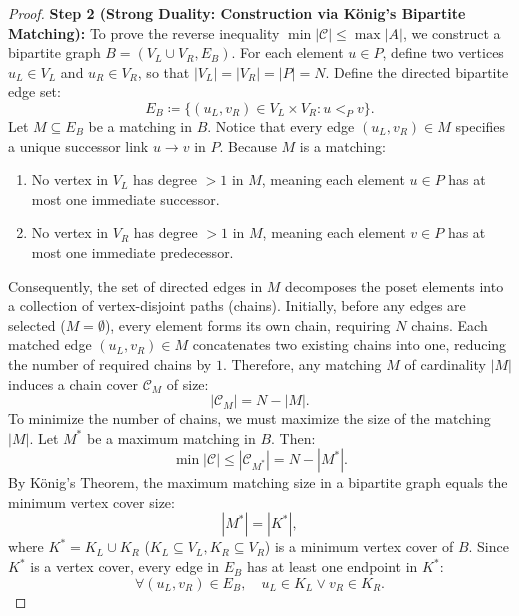 \documentclass[11pt, letterpaper]{article}
\begin{document}
\begin{proof}
\medskip\noindent\textbf{Step 2 (Strong Duality: Construction via K\"{o}nig's Bipartite Matching):}
To prove the reverse inequality $\min |\mathcal{C}| \le \max |A|$, we construct a bipartite graph $B = (V_L \cup V_R, E_B)$. 
For each element $u \in P$, define two vertices $u_L \in V_L$ and $u_R \in V_R$, so that $|V_L| = |V_R| = |P| = N$. 
Define the directed bipartite edge set:
\begin{equation}
    E_B \coloneqq \{(u_L, v_R) \in V_L \times V_R : u <_P v\}.
\end{equation}
Let $M \subseteq E_B$ be a matching in $B$. Notice that every edge $(u_L, v_R) \in M$ specifies a unique successor link $u \to v$ in $P$. Because $M$ is a matching:
\begin{enumerate}
    \item No vertex in $V_L$ has degree $> 1$ in $M$, meaning each element $u \in P$ has at most one immediate successor.
    \item No vertex in $V_R$ has degree $> 1$ in $M$, meaning each element $v \in P$ has at most one immediate predecessor.
\end{enumerate}
Consequently, the set of directed edges in $M$ decomposes the poset elements into a collection of vertex-disjoint paths (chains). 
Initially, before any edges are selected ($M = \emptyset$), every element forms its own chain, requiring $N$ chains. Each matched edge $(u_L, v_R) \in M$ concatenates two existing chains into one, reducing the number of required chains by $1$. 
Therefore, any matching $M$ of cardinality $|M|$ induces a chain cover $\mathcal{C}_M$ of size:
\begin{equation}
    |\mathcal{C}_M| = N - |M|.
\end{equation}
To minimize the number of chains, we must maximize the size of the matching $|M|$. Let $M^*$ be a maximum matching in $B$. Then:
\begin{equation}
    \min |\mathcal{C}| \le |\mathcal{C}_{M^*}| = N - |M^*|.
\end{equation}
By König's Theorem, the maximum matching size in a bipartite graph equals the minimum vertex cover size:
\begin{equation}
    |M^*| = |K^*|,
\end{equation}
where $K^* = K_L \cup K_R$ ($K_L \subseteq V_L, K_R \subseteq V_R$) is a minimum vertex cover of $B$. 
Since $K^*$ is a vertex cover, every edge in $E_B$ has at least one endpoint in $K^*$:
\begin{equation}
    \forall (u_L, v_R) \in E_B, \quad u_L \in K_L \lor v_R \in K_R.

\end{equation}
\end{proof}
\end{document}
